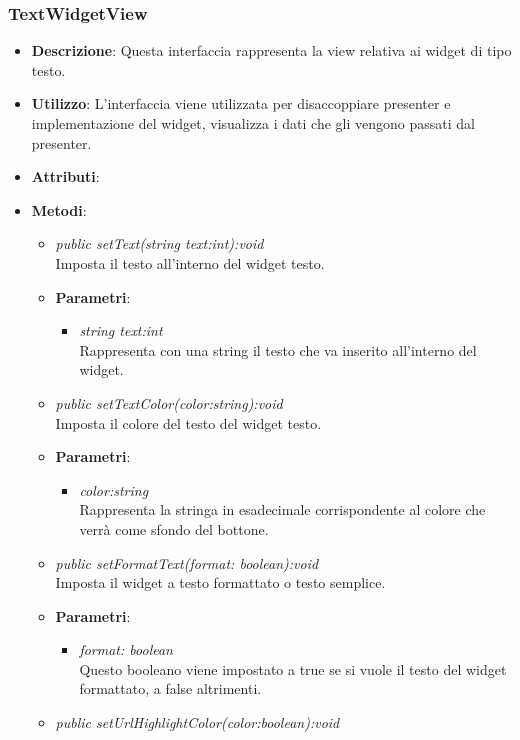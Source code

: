 \subsubsection{TextWidgetView}
\begin{itemize}
\item \textbf{Descrizione}: Questa interfaccia rappresenta la view relativa ai widget di tipo testo.
\item \textbf{Utilizzo}: L'interfaccia viene utilizzata per disaccoppiare presenter e implementazione del widget, visualizza i dati che gli vengono passati dal presenter.
\item \textbf{Attributi}:
\item \textbf{Metodi}:
	\begin{itemize}
	\item \textit{public setText(string text:int):void}\\
	Imposta il testo all'interno del widget testo.
		\item{\textbf{Parametri}: \begin{itemize}
		\item \textit{string text:int}\\
		Rappresenta con una string il testo che va inserito all'interno del widget.
		\end{itemize}}
	\item \textit{public setTextColor(color:string):void}\\
	Imposta il colore del testo del widget testo.
		\item{\textbf{Parametri}: \begin{itemize}
		\item \textit{color:string}\\
		Rappresenta la stringa in esadecimale corrispondente al colore che verrà come sfondo del bottone.
		\end{itemize}}
	\item \textit{public setFormatText(format: boolean):void}\\
	Imposta il widget a testo formattato o testo semplice.
		\item{\textbf{Parametri}: \begin{itemize}
		\item \textit{format: boolean}\\
		Questo booleano viene impostato a true se si vuole il testo del widget formattato, a false altrimenti.
		\end{itemize}}
	\item \textit{public setUrlHighlightColor(color:boolean):void}\\

\end{itemize}
\end{itemize}
